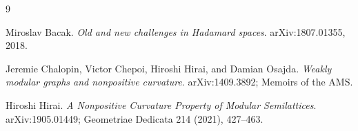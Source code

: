 \documentclass[11pt]{article}
\begin{document}
\begin{thebibliography}{9}

Miroslav Bacak.
\newblock \emph{Old and new challenges in Hadamard spaces}.
\newblock arXiv:1807.01355, 2018.

Jeremie Chalopin, Victor Chepoi, Hiroshi Hirai, and Damian Osajda.
\newblock \emph{Weakly modular graphs and nonpositive curvature}.
\newblock arXiv:1409.3892; Memoirs of the AMS.

Hiroshi Hirai.
\newblock \emph{A Nonpositive Curvature Property of Modular Semilattices}.
\newblock arXiv:1905.01449; Geometriae Dedicata 214 (2021), 427--463.

\end{thebibliography}
\end{document}
